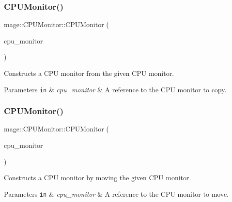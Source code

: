 \subsubsection{\texorpdfstring{C\+P\+U\+Monitor()}{CPUMonitor()}\hspace{0.1cm}{\footnotesize\ttfamily [2/3]}}
{\footnotesize\ttfamily mage\+::\+C\+P\+U\+Monitor\+::\+C\+P\+U\+Monitor (\begin{DoxyParamCaption}\item[{const \hyperlink{classmage_1_1_c_p_u_monitor}{C\+P\+U\+Monitor} \&}]{cpu\+\_\+monitor }\end{DoxyParamCaption})}

Constructs a C\+PU monitor from the given C\+PU monitor.


\begin{DoxyParams}[1]{Parameters}
\mbox{\tt in}  & {\em cpu\+\_\+monitor} & A reference to the C\+PU monitor to copy. \\
\hline
\end{DoxyParams}
\hypertarget{classmage_1_1_c_p_u_monitor_ae2002af06ed2928e41c97e401077ae16}{}\label{classmage_1_1_c_p_u_monitor_ae2002af06ed2928e41c97e401077ae16} 
\subsubsection{\texorpdfstring{C\+P\+U\+Monitor()}{CPUMonitor()}\hspace{0.1cm}{\footnotesize\ttfamily [3/3]}}
{\footnotesize\ttfamily mage\+::\+C\+P\+U\+Monitor\+::\+C\+P\+U\+Monitor (\begin{DoxyParamCaption}\item[{\hyperlink{classmage_1_1_c_p_u_monitor}{C\+P\+U\+Monitor} \&\&}]{cpu\+\_\+monitor }\end{DoxyParamCaption})\hspace{0.3cm}{\ttfamily [default]}}

Constructs a C\+PU monitor by moving the given C\+PU monitor.


\begin{DoxyParams}[1]{Parameters}
\mbox{\tt in}  & {\em cpu\+\_\+monitor} & A reference to the C\+PU monitor to move. \\
\hline
\end{DoxyParams}
\hypertarget{classmage_1_1_c_p_u_monitor_a597ea4b27675a22d3d66a1d817b26652}{}\label{classmage_1_1_c_p_u_monitor_a597ea4b27675a22d3d66a1d817b26652} 
